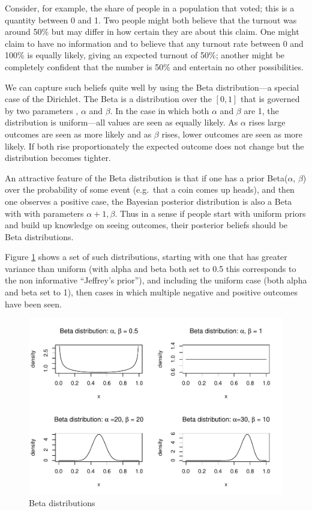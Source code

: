 \documentclass[
  12pt,
]{book}
\begin{document}
Consider, for example, the share of people in a population that voted; this is a quantity between 0 and 1. Two people might both believe that the turnout was around 50\% but may differ in how certain they are about this claim. One might claim to have no information and to believe that any turnout rate between 0 and 100\% is equally likely, giving an expected turnout of 50\%; another might be completely confident that the number is 50\% and entertain no other possibilities.

We can capture such beliefs quite well by using the Beta distribution---a special case of the Dirichlet. The Beta is a distribution over the \([0,1]\) that is governed by two parameters , \(\alpha\) and \(\beta\). In the case in which both \(\alpha\) and \(\beta\) are 1, the distribution is uniform---all values are seen as equally likely. As \(\alpha\) rises large outcomes are seen as more likely and as \(\beta\) rises, lower outcomes are seen as more likely. If both rise proportionately the expected outcome does not change but the distribution becomes tighter.

An attractive feature of the Beta distribution is that if one has a prior Beta(\(\alpha\), \(\beta\)) over the probability of some event (e.g.~that a coin comes up heads), and then one observes a positive case, the Bayesian posterior distribution is also a Beta with with parameters \(\alpha+1, \beta\). Thus in a sense if people start with uniform priors and build up knowledge on seeing outcomes, their posterior beliefs should be Beta distributions.

Figure \ref{fig:Betas} shows a set of such distributions, starting with one that has greater variance than uniform (with alpha and beta both set to 0.5 this corresponds to the non informative ``Jeffrey's prior''), and including the uniform case (both alpha and beta set to 1), then cases in which multiple negative and positive outcomes have been seen.

\begin{figure}
\centering
\includegraphics{ii_files/figure-latex/Betas-1.pdf}
\caption{\label{fig:Betas}Beta distributions}
\end{figure}
\end{document}
